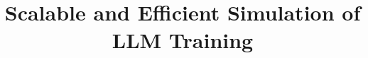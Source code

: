 \documentclass[conference]{IEEEtran}
\begin{document}
\title{Scalable and Efficient Simulation of LLM Training}


\maketitle

















\balance


\end{document}
